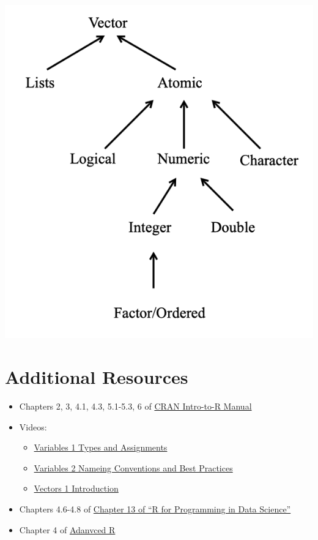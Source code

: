\documentclass[
]{book}
\providecommand{\tightlist}{%
  \setlength{\itemsep}{0pt}\setlength{\parskip}{0pt}}
\begin{document}
\begin{center}\includegraphics[width=8in]{images/Vector_chart} \end{center}

\hypertarget{additional-resources-1}{%
\section*{Additional Resources}\label{additional-resources-1}}

\begin{itemize}
\tightlist
\item
  Chapters 2, 3, 4.1, 4.3, 5.1-5.3, 6 of \href{https://cran.r-project.org/doc/manuals/r-release/R-intro.pdf}{CRAN Intro-to-R Manual}
\item
  Videos:

  \begin{itemize}
  \tightlist
  \item
    \href{https://ucr.yuja.com/V/Video?v=2368642\&node=8487537\&a=1529691043\&autoplay=1}{Variables 1 \textbar{} Types and Assignments}
  \item
    \href{https://ucr.yuja.com/V/Video?v=2368641\&node=8487536\&a=957339369\&autoplay=1}{Variables 2 \textbar{} Nameing Conventions and Best Practices}
  \item
    \href{https://ucr.yuja.com/V/Video?v=2368859\&node=8488053\&a=283774152\&autoplay=1}{Vectors 1 \textbar{} Introduction}
  \end{itemize}
\item
  Chapters 4.6-4.8 of \href{https://bookdown.org/rdpeng/rprogdatascience/}{Chapter 13 of ``R for Programming in Data Science''}
\item
  Chapter 4 of \href{https://adv-r.hadley.nz/index.html}{Adanvced R}
\end{itemize}
\end{document}
